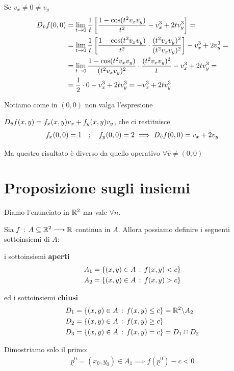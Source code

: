 \begin{enumerate}
	Se $v_x\neq 0 \neq v_y$
	\begin{align}
		D_{\hat v} f(0,0) {}&= \underset{t \rightarrow 0}{\lim} \,\frac{1}{t} \left[ \frac{1- \cos(t^2 v_x v_y)}{t^2} -  v_x^3 + 2 tv_y^3 \right] = \nonumber \\
		&= \underset{t \rightarrow 0}{\lim} \, \frac{1}{t} \left[\frac{1-\cos(t^2 v_x v_y)}{t^2} \cdot \frac{(t^2v_x v_y)^2}{(t^2v_x v_y)^2} \right] - v_x^3 + 2 v_y^3 = \nonumber \\
		&= \underset{t \rightarrow 0}{\lim} \, \frac{1-\cos(t^2 v_x v_y)}{(t^2v_x v_y)^2} \cdot \frac{(t^2v_x v_y)^2}{t} -  v_x^3 + 2 tv_y^3 = \nonumber \\
		&= \frac{1}{2} \cdot 0 -  v_x^3 + 2 tv_y^3 = -  v_x^3 + 2 tv_y^3
	\end{align}
	
	Notiamo come in $(0,0)$ non valga l'espresione
	
	$D_{\hat v} f(x,y)= f_x(x,y) v_x + f_y(x,y) v_y$, che ci restituisce
	\begin{align}
		f_x(0,0)=1 \quad ; \quad f_y(0,0)=2 \implies D_{\hat v} f(0,0)=  v_x + 2 v_y
	\end{align}
	
	Ma questro risultato è diverso da quello operativo $\forall \hat{v} \neq (0,0)$
\end{enumerate}

\newpage

\section{Proposizione sugli insiemi}

Diamo l'enunciato in $\mathbb{R}^2$ ma vale $\forall n$. 

Sia $f \, : \, A\subseteq\mathbb{R}^2 \longrightarrow \mathbb{R}$ continua in $A$. Allora possiamo definire i seguenti sottoinsiemi di $A$:

i sottoinsiemi \textbf{aperti}
\begin{align}
	{}& A_1 = \{(x,y) \in A \, : \, f(x,y)<c\} \\
	& A_2 = \{(x,y) \in A \, : \, f(x,y)>c\} \\
\end{align}

ed i sottoinsiemi \textbf{chiusi}
\begin{align}
	{}&D_1 = \{(x,y) \in A \, : \, f(x,y)\leq c\} = \mathbb{R}^2 \backslash A_2\\
	&D_2 = \{(x,y) \in A \, : \, f(x,y)\geq c\} \\
	&D_3 = \{(x,y) \in A \, : \, f(x,y)= c\}= D_1 \cap D_2
\end{align} 

Dimostriamo solo il primo:
\begin{align}
	\underline{p}^0=(x_0,y_0)\in A_1 \implies f(\underline{p}^0)-c <0
\end{align}

